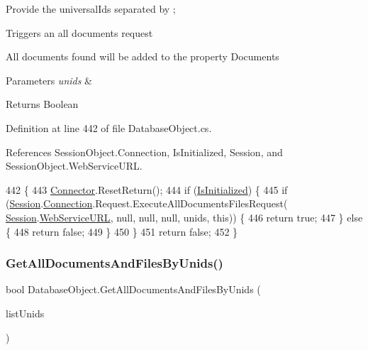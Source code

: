 Provide the universal\+Ids separated by ;

Triggers an all documents request

All documents found will be added to the property \textquotesingle{}Documents\textquotesingle{}


\begin{DoxyParams}{Parameters}
{\em unids} & \\
\hline
\end{DoxyParams}
\begin{DoxyReturn}{Returns}
Boolean
\end{DoxyReturn}


Definition at line 442 of file Database\+Object.\+cs.



References Session\+Object.\+Connection, Is\+Initialized, Session, and Session\+Object.\+Web\+Service\+U\+RL.


\begin{DoxyCode}
442                                                              \{
443         \mbox{\hyperlink{class_connector}{Connector}}.ResetReturn();
444         \textcolor{keywordflow}{if} (\mbox{\hyperlink{class_database_object_a5fe036d32a30eb10d1b3f6a30263f740}{IsInitialized}}) \{
445             \textcolor{keywordflow}{if} (\mbox{\hyperlink{class_database_object_aa8484162b7d2a7c4c9426bca13c64c07}{Session}}.\mbox{\hyperlink{class_session_object_a014bdbf705a753540e19bfb53030c55c}{Connection}}.Request.ExecuteAllDocumentsFilesRequest(
      \mbox{\hyperlink{class_database_object_aa8484162b7d2a7c4c9426bca13c64c07}{Session}}.\mbox{\hyperlink{class_session_object_a697c071c812fbf7ad1166b896fb44c16}{WebServiceURL}}, null, null, null, unids, \textcolor{keyword}{this})) \{
446                 \textcolor{keywordflow}{return} \textcolor{keyword}{true};
447             \} \textcolor{keywordflow}{else} \{
448                 \textcolor{keywordflow}{return} \textcolor{keyword}{false};
449             \}
450         \}
451         \textcolor{keywordflow}{return} \textcolor{keyword}{false};
452     \}
\end{DoxyCode}
\mbox{\label{class_database_object_aa69262a50977a28a2decf400d1eedd20}} 
\subsubsection{\texorpdfstring{Get\+All\+Documents\+And\+Files\+By\+Unids()}{GetAllDocumentsAndFilesByUnids()}\hspace{0.1cm}{\footnotesize\ttfamily [2/2]}}
{\footnotesize\ttfamily bool Database\+Object.\+Get\+All\+Documents\+And\+Files\+By\+Unids (\begin{DoxyParamCaption}\item[{I\+List}]{list\+Unids }\end{DoxyParamCaption})}



